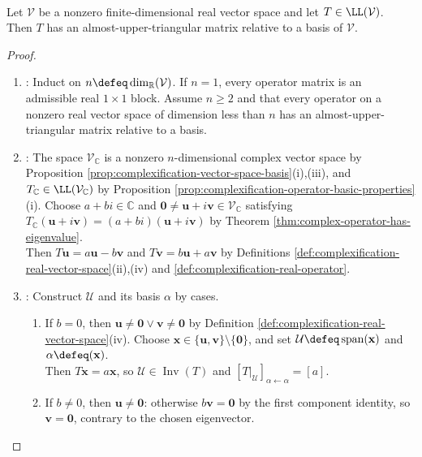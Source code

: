 \begin{theorem} \label{thm:real-almost-upper-triangularization} \\
Let $\mathcal{V}$ be a nonzero finite-dimensional real vector space and let $T\in\LL(\mathcal{V})$.\\
Then $T$ has an almost-upper-triangular matrix relative to a basis of $\mathcal{V}$.
\begin{proof}
\begin{enumerate}[label=(\roman*)]
\setlength{\itemsep}{0pt}
\item {}: Induct on $n\defeq\dim_{\mathbb{R}}(\mathcal{V})$. If $n=1$, every operator matrix is an admissible real $1\times1$ block. Assume $n\geq2$ and that every operator on a nonzero real vector space of dimension less than $n$ has an almost-upper-triangular matrix relative to a basis.
\item {}: The space $\mathcal{V}_{\mathbb{C}}$ is a nonzero $n$-dimensional complex vector space by Proposition \ref{prop:complexification-vector-space-basis}(i),(iii), and $T_{\mathbb{C}}\in\LL(\mathcal{V}_{\mathbb{C}})$ by Proposition \ref{prop:complexification-operator-basic-properties}(i). Choose $a+bi\in\mathbb{C}$ and $\mathbf{0}\neq\mathbf{u}+i\mathbf{v}\in\mathcal{V}_{\mathbb{C}}$ satisfying $T_{\mathbb{C}}(\mathbf{u}+i\mathbf{v})=(a+bi)(\mathbf{u}+i\mathbf{v})$ by Theorem \ref{thm:complex-operator-has-eigenvalue}.\\
Then $T\mathbf{u}=a\mathbf{u}-b\mathbf{v}$ and $T\mathbf{v}=b\mathbf{u}+a\mathbf{v}$ by Definitions \ref{def:complexification-real-vector-space}(ii),(iv) and \ref{def:complexification-real-operator}.
\item {}: Construct $\mathcal{U}$ and its basis $\alpha$ by cases.
\begin{enumerate}[label=(\alph*)]
\setlength{\itemsep}{0pt}
\item If $b=0$, then $\mathbf{u}\neq\mathbf{0}\lor\mathbf{v}\neq\mathbf{0}$ by Definition \ref{def:complexification-real-vector-space}(iv). Choose $\mathbf{x}\in\{\mathbf{u},\mathbf{v}\}\setminus\{\mathbf{0}\}$, and set $\mathcal{U}\defeq\operatorname{span}(\mathbf{x})$ and $\alpha\defeq(\mathbf{x})$.\\
Then $T\mathbf{x}=a\mathbf{x}$, so $\mathcal{U}\in\operatorname{Inv}(T)$ and $[T|_{\mathcal{U}}]_{\alpha\leftarrow\alpha}=[a]$.
\item If $b\neq0$, then $\mathbf{u}\neq\mathbf{0}$: otherwise $b\mathbf{v}=\mathbf{0}$ by the first component identity, so $\mathbf{v}=\mathbf{0}$, contrary to the chosen eigenvector.\\

\end{enumerate}
\end{enumerate}
\end{proof}
\end{theorem}
